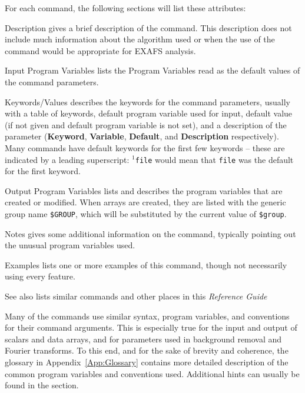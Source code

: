 For each command, the following sections will list these attributes:
\begin{IFFcom}
\item[Description] gives a brief description of the command.
  This description does not include much information about the algorithm
  used or when the use of the command would be appropriate for EXAFS
  analysis.
\item [Input Program Variables] lists the Program Variables
  read as the default values of the command parameters.
\item [Keywords/Values] describes the keywords for the command
  parameters, usually with a table of keywords, default program variable used
  for input, default value (if not given and default program variable is not
  set), and a description of the parameter (\textbf{Keyword},
  \textbf{Variable}, \textbf{Default}, and \textbf{Description} respectively).
  Many commands have default keywords for the first few keywords -- these are
  indicated by a leading superscript: {\tt{${}^{1}$file}} would mean that
  {\tt{file}} was the default for the first keyword.
\item [Output Program Variables] lists and describes the program
 variables that are created or modified.    When arrays are created, they
 are listed with the generic group name {\tt{\$GROUP}}, which will be
 substituted by the current value of {\tt{\$group}}.
\item [Notes] gives some additional information on the command, typically
  pointing out the unusual program variables used. 
\item [Examples] lists one or more examples of this command, though not
  necessarily using every feature.
\item [See also] lists similar commands and other places in this
  {\textsl{Reference Guide}} 

\end{IFFcom}
\noindent

Many of the {\ifeffit} commands use similar syntax, program variables, and
conventions for their command arguments.  This is especially true for the
input and output of scalars and data arrays, and for parameters used in
background removal and Fourier transforms.  To this end, and for the sake of
brevity and coherence, the glossary in Appendix~{\ref{App:Glossary}} contains
more detailed description of the common program variables and conventions
used.  Additional hints can usually be found in the  section.


